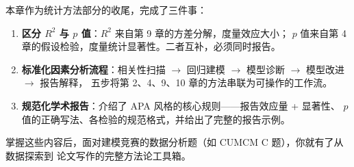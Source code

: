 本章作为统计方法部分的收尾，完成了三件事：

\begin{enumerate}
    \item \textbf{区分 $R^2$ 与 $p$ 值}：$R^2$ 来自第 9 章的方差分解，度量效应大小；
    $p$ 值来自第 4 章的假设检验，度量统计显著性。二者互补，必须同时报告。
    \item \textbf{标准化因素分析流程}：相关性扫描 $\to$ 回归建模 $\to$ 模型诊断 $\to$ 模型改进 $\to$ 报告解释，
    五步将第 2、4、9、10 章的方法串联为可操作的工作流。
    \item \textbf{规范化学术报告}：介绍了 APA 风格的核心规则——报告效应量 + 显著性、
    $p$ 值的正确写法、各检验的规范格式，并给出了完整的报告示例。
\end{enumerate}

掌握这些内容后，面对建模竞赛的数据分析题（如 CUMCM C 题），你就有了从数据探索到
论文写作的完整方法论工具箱。

